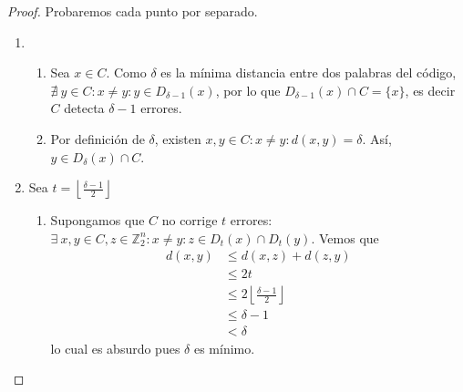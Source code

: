 \begin{proof}
Probaremos cada punto por separado.
\begin{enumerate}
\item
    \begin{enumerate}
        \item Sea $x\in C$. Como $\delta$ es la mínima distancia entre dos palabras del código, $\nexists~ y \in C : x \neq y : y \in D_{\delta-1}(x)$, por lo que $D_{\delta-1}(x) \cap C = \{ x \}$, es decir $C$ detecta $\delta - 1$ errores.
        \item Por definición de $\delta$, existen $x,y \in C : x \neq y : d(x,y) = \delta$. Así, $y \in D_{\delta}(x) \cap C$.
    \end{enumerate}

\item Sea $t = \left\lfloor{\frac{\delta - 1}{2}}\right\rfloor$
    \begin{enumerate}
        \item Supongamos que $C$ no corrige $t$ errores: $\exists~ x,y \in C, z \in \mathbb{Z}_2^n: x \neq y : z \in D_t(x) \cap D_t(y)$. Vemos que
        \begin{align}
            d(x,y) &\le d(x,z) + d(z,y)\\
            & \le 2t\\
            & \le 2 \left\lfloor{\frac{\delta - 1}{2}}\right\rfloor\\
            & \le \delta - 1\\
            & < \delta
        \end{align}
        lo cual es absurdo pues $\delta$ es mínimo.
        

\end{enumerate}
\end{enumerate}
\end{proof}
